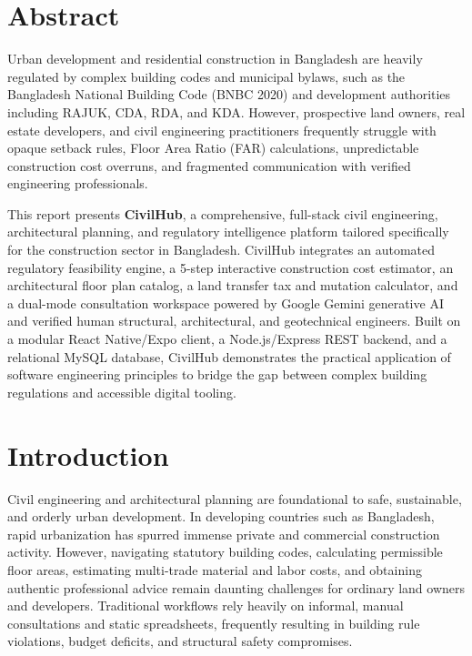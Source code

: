 \documentclass[12pt,a4paper]{article}
\begin{document}
\newpage
\section*{Abstract}

Urban development and residential construction in Bangladesh are heavily regulated by complex building codes and municipal bylaws, such as the Bangladesh National Building Code (BNBC 2020) and development authorities including RAJUK, CDA, RDA, and KDA. However, prospective land owners, real estate developers, and civil engineering practitioners frequently struggle with opaque setback rules, Floor Area Ratio (FAR) calculations, unpredictable construction cost overruns, and fragmented communication with verified engineering professionals.

This report presents \textbf{CivilHub}, a comprehensive, full-stack civil engineering, architectural planning, and regulatory intelligence platform tailored specifically for the construction sector in Bangladesh. CivilHub integrates an automated regulatory feasibility engine, a 5-step interactive construction cost estimator, an architectural floor plan catalog, a land transfer tax and mutation calculator, and a dual-mode consultation workspace powered by Google Gemini generative AI and verified human structural, architectural, and geotechnical engineers. Built on a modular React Native/Expo client, a Node.js/Express REST backend, and a relational MySQL database, CivilHub demonstrates the practical application of software engineering principles to bridge the gap between complex building regulations and accessible digital tooling.

\newpage
{}
\setcounter{page}{1}

\section{Introduction}
Civil engineering and architectural planning are foundational to safe, sustainable, and orderly urban development. In developing countries such as Bangladesh, rapid urbanization has spurred immense private and commercial construction activity. However, navigating statutory building codes, calculating permissible floor areas, estimating multi-trade material and labor costs, and obtaining authentic professional advice remain daunting challenges for ordinary land owners and developers. Traditional workflows rely heavily on informal, manual consultations and static spreadsheets, frequently resulting in building rule violations, budget deficits, and structural safety compromises.
\end{document}
